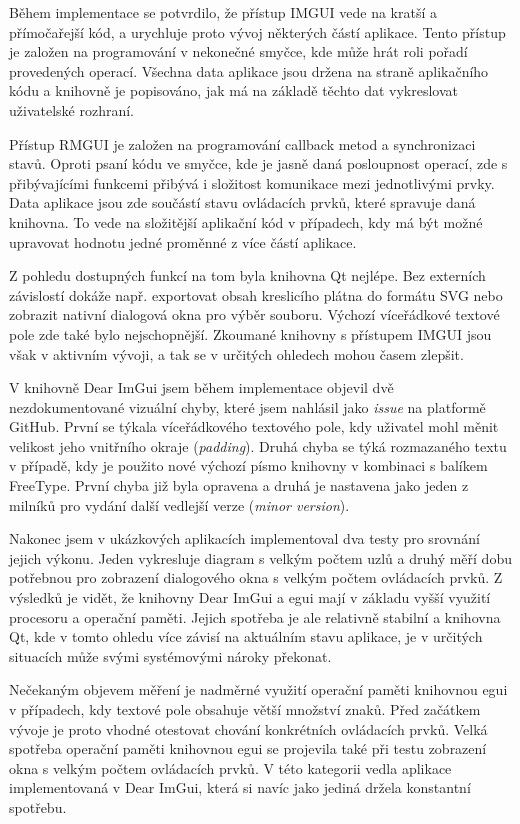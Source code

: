 \documentclass[FM,DP]{tulthesis}
\begin{document}
	Během implementace se potvrdilo, že přístup IMGUI vede na kratší a přímočařejší kód, a urychluje proto vývoj některých částí aplikace. Tento přístup je založen na programování v nekonečné smyčce, kde může hrát roli pořadí provedených operací. Všechna data aplikace jsou držena na straně aplikačního kódu a knihovně je popisováno, jak má na základě těchto dat vykreslovat uživatelské rozhraní.
	
	Přístup RMGUI je založen na programování callback metod a synchronizaci stavů. Oproti psaní kódu ve smyčce, kde je jasně daná posloupnost operací, zde s přibývajícími funkcemi přibývá i složitost komunikace mezi jednotlivými prvky. Data aplikace jsou zde součástí stavu ovládacích prvků, které spravuje daná knihovna. To vede na složitější aplikační kód v případech, kdy má být možné upravovat hodnotu jedné proměnné z více částí aplikace.
	
	Z pohledu dostupných funkcí na tom byla knihovna Qt nejlépe. Bez externích závislostí dokáže např. exportovat obsah kreslicího plátna do formátu SVG nebo zobrazit nativní dialogová okna pro výběr souboru. Výchozí víceřádkové textové pole zde také bylo nejschopnější. Zkoumané knihovny s přístupem IMGUI jsou však v aktivním vývoji, a tak se v určitých ohledech mohou časem zlepšit.
	
	V knihovně Dear ImGui jsem během implementace objevil dvě nezdokumentované vizuální chyby, které jsem nahlásil jako \textit{issue} na platformě GitHub. První se týkala víceřádkového textového pole, kdy uživatel mohl měnit velikost jeho vnitřního okraje (\textit{padding}). Druhá chyba se týká rozmazaného textu v případě, kdy je použito nové výchozí písmo knihovny v kombinaci s balíkem FreeType. První chyba již byla opravena a druhá je nastavena jako jeden z milníků pro vydání další vedlejší verze (\textit{minor version}).
	
	Nakonec jsem v ukázkových aplikacích implementoval dva testy pro srovnání jejich výkonu. Jeden vykresluje diagram s velkým počtem uzlů a druhý měří dobu potřebnou pro zobrazení dialogového okna s velkým počtem ovládacích prvků. Z výsledků je vidět, že knihovny Dear ImGui a egui mají v základu vyšší využití procesoru a operační paměti. Jejich spotřeba je ale relativně stabilní a knihovna Qt, kde v tomto ohledu více závisí na aktuálním stavu aplikace, je v určitých situacích může svými systémovými nároky překonat.
	
	Nečekaným objevem měření je nadměrné využití operační paměti knihovnou egui v případech, kdy textové pole obsahuje větší množství znaků. Před začátkem vývoje je proto vhodné otestovat chování konkrétních ovládacích prvků. Velká spotřeba operační paměti knihovnou egui se projevila také při testu zobrazení okna s velkým počtem ovládacích prvků. V této kategorii vedla aplikace implementovaná v Dear ImGui, která si navíc jako jediná držela konstantní spotřebu.
		
\end{document}
